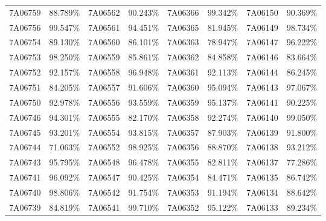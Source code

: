 \documentclass[12pt]{article}%
\begin{document}
\begin{longtable}{|cc|cc|cc|cc|}
7A06759              & 88.789\% & 7A06562              & 90.243\% & 7A06366              & 99.342\% & \multicolumn{1}{l}{7A06150             } & 90.369\% \\
7A06756              & 99.547\% & 7A06561              & 94.451\% & 7A06365              & 81.945\% & \multicolumn{1}{l}{7A06149             } & 98.734\% \\
7A06754              & 89.130\% & 7A06560              & 86.101\% & 7A06363              & 78.947\% & \multicolumn{1}{l}{7A06147             } & 96.222\% \\
7A06753              & 98.250\% & 7A06559              & 85.861\% & 7A06362              & 84.858\% & \multicolumn{1}{l}{7A06146             } & 83.664\% \\
7A06752              & 92.157\% & 7A06558              & 96.948\% & 7A06361              & 92.113\% & \multicolumn{1}{l}{7A06144             } & 86.245\% \\
7A06751              & 84.205\% & 7A06557              & 91.606\% & 7A06360              & 95.094\% & \multicolumn{1}{l}{7A06143             } & 97.067\% \\
7A06750              & 92.978\% & 7A06556              & 93.559\% & 7A06359              & 95.137\% & \multicolumn{1}{l}{7A06141             } & 90.225\% \\
7A06746              & 94.301\% & 7A06555              & 82.170\% & 7A06358              & 92.274\% & \multicolumn{1}{l}{7A06140             } & 99.050\% \\
7A06745              & 93.201\% & 7A06554              & 93.815\% & 7A06357              & 87.903\% & \multicolumn{1}{l}{7A06139             } & 91.800\% \\
7A06744              & 71.063\% & 7A06552              & 98.925\% & 7A06356              & 88.870\% & \multicolumn{1}{l}{7A06138             } & 93.212\% \\
7A06743              & 95.795\% & 7A06548              & 96.478\% & 7A06355              & 82.811\% & \multicolumn{1}{l}{7A06137             } & 77.286\% \\
7A06741              & 96.092\% & 7A06547              & 90.425\% & 7A06354              & 84.471\% & \multicolumn{1}{l}{7A06135             } & 86.742\% \\
7A06740              & 98.806\% & 7A06542              & 91.754\% & 7A06353              & 91.194\% & \multicolumn{1}{l}{7A06134             } & 88.642\% \\
7A06739              & 84.819\% & 7A06541              & 99.710\% & 7A06352              & 95.122\% & \multicolumn{1}{l}{7A06133             } & 89.234\% \\

\end{longtable}
\end{document}
